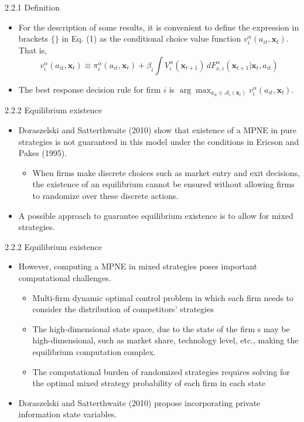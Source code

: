 \documentclass[aspectratio=169]{beamer}  %
\begin{document}
\begin{frame}
{2.2.1 Definition}
    \begin{itemize}
        \item For the description of some results, it is convenient to define the expression in brackets \(\{\}\) in Eq. (1) as the conditional choice value function \(v_i^\alpha(a_{it}, \mathbf{x}_t)\). That is,
        \begin{equation}\label{2}
            v_i^\alpha(a_{it}, \mathbf{x}_t) \equiv \pi_i^\alpha(a_{it}, \mathbf{x}_t) + \beta_i \int V_i^\alpha(\mathbf{x}_{t+1}) \, dF_{x,i}^\alpha(\mathbf{x}_{t+1}|\mathbf{x}_t, a_{it})
        \end{equation}
        \item The best response decision rule for firm \(i\) is \(\arg\max_{a_{it} \in \mathcal{A}_i(\mathbf{x}_t)} v_i^\alpha(a_{it}, \mathbf{x}_t)\).
    \end{itemize}

\end{frame}


\begin{frame}{2.2.2 Equilibrium existence}
\begin{itemize}
    \item Doraszelski and Satterthwaite (2010) show that existence of a MPNE in pure strategies is not guaranteed in this model under the conditions in Ericson and Pakes (1995).
    \begin{itemize}
        \item When firms make discrete choices such as market entry and exit decisions, the existence of an equilibrium cannot be ensured without allowing firms to randomize over these discrete actions.
    \end{itemize}
    \item A possible approach to guarantee equilibrium existence is to allow for mixed strategies.
\end{itemize}
\end{frame}

\begin{frame}
{2.2.2 Equilibrium existence}
\begin{itemize}
     \item However, computing a MPNE in mixed strategies poses important computational challenges.
    \begin{itemize}
        \item Multi-firm dynamic optimal control problem in which each firm needs to consider the distribution of competitors' strategies 
        \item The high-dimensional state space, due to the state of the firm s may be high-dimensional, such as market share, technology level, etc., making the equilibrium computation complex.
        \item The computational burden of randomized strategies requires solving for the optimal mixed strategy probability of each firm in each state 
    \end{itemize}
    \item Doraszelski and Satterthwaite (2010) propose incorporating private information state variables.
\end{itemize}
\end{frame}
\end{document}
